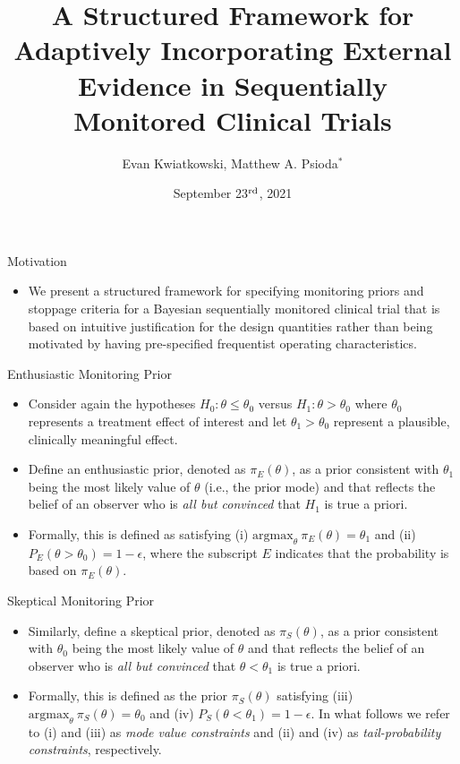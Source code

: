\documentclass{beamer}
\title[]{A Structured Framework for Adaptively Incorporating External Evidence in Sequentially Monitored Clinical Trials}
\author[]{
Evan Kwiatkowski, %
Matthew A. Psioda$^*$
}
\institute{
Department of Biostatistics, University of North Carolina at Chapel Hill%
}
\date{\scriptsize{September 23$\textsuperscript{rd}$, 2021}}
\begin{document}
\beamertemplatefootpagenumber
\maketitle

\begin{frame}{Motivation}
\begin{itemize}
\item We present a structured framework for specifying monitoring priors and stoppage criteria for a Bayesian sequentially monitored clinical trial that is based on intuitive justification for the design quantities rather than being motivated by having pre-specified frequentist operating characteristics.
\end{itemize}
\end{frame}


\begin{frame}{Enthusiastic Monitoring Prior}
\begin{itemize}
\item Consider again the hypotheses $H_0: \theta \le \theta_0$ versus $H_1: \theta > \theta_0$ where $\theta_0$ represents a 
treatment effect of interest and let $\theta_1>\theta_0$ represent a plausible, clinically meaningful effect.
%
\item Define an enthusiastic prior, denoted as $\pi_{E}(\theta)$, as a prior consistent with $\theta_1$ being the most 
likely value of $\theta$ (i.e., the prior mode) and that reflects the belief of an observer who is 
\textit{all but convinced} that $H_1$ is true a priori. 
%
\item Formally, this is defined as satisfying (i) $\text{argmax}_\theta~\pi_E(\theta)=\theta_1$
and (ii) $P_E(\theta >\theta_0)=1-\epsilon$, where the subscript $E$ indicates that the probability is 
based on $\pi_{E}(\theta)$.
\end{itemize}
\end{frame}

\begin{frame}{Skeptical Monitoring Prior}
\begin{itemize}
\item 
Similarly, define a skeptical prior, denoted as $\pi_{S}(\theta)$, as a prior consistent with $\theta_0$ being the most 
likely value of $\theta$ and that reflects the belief of an observer who is \textit{all but convinced} that 
$\theta <\theta_1$ is true a priori. 
%
\item Formally, this is defined as the prior $\pi_{S}(\theta)$ satisfying
(iii) $\text{argmax}_\theta~\pi_S(\theta)=\theta_0$  and (iv) $P_S(\theta <\theta_1)=1-\epsilon$.
%
In what follows we refer to (i) and (iii) as \textit{mode value constraints} and (ii) and (iv) as \textit{tail-probability constraints}, respectively.
\end{itemize}
\end{frame}
\end{document}
